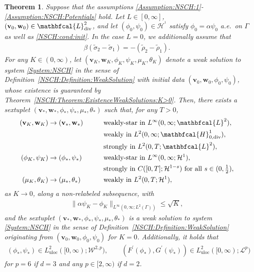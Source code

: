 \documentclass[11pt,reqno]{amsart}
\newtheorem{theorem}{Theorem}[section]
\theoremstyle{remark}
\numberwithin{equation}{section}
\newcommand{\norm}[1]{\| #1 \|}
\newcommand{\Div}{\textnormal{div}}
\newcommand{\Ga}{\Gamma}
\newcommand{\bv}{\mathbf v}
\newcommand{\bw}{\mathbf w}
\newcommand{\uloc}{\mathrm{uloc}}
\begin{document}
\begin{theorem}\label{NSCH:Theorem:Existence:K=0}
Suppose that the assumptions \ref{Assumption:NSCH:1}-\ref{Assumption:NSCH:Potentials} hold. Let $L\in[0,\infty]$, $(\bv_0,\bw_0)\in\mathbfcal{L}^2_\Div$, and let $(\phi_0,\psi_0)\in\mathcal{H}^^1$ satisfy $\phi_0 = \alpha\psi_0$ a.e.~on $\Ga$ as well as \eqref{NSCH:cond:init}.
In the case $L = 0$, we additionally assume that
\begin{align}
	\beta(\tilde\sigma_2 - \tilde\sigma_1) = -(\tilde\rho_2 - \tilde\rho_1).
\end{align}
For any $K\in(0,\infty)$, let $(\bv_K,\bw_K,\phi_K,\psi_K,\mu_K,\theta_K)$ denote a weak solution to system \eqref{System:NSCH} in the sense of Definition~\ref{NSCH:Definition:WeakSolution} with initial data $(\bv_0,\bw_0,\phi_0,\psi_0)$, whose existence is guaranteed by Theorem~\ref{NSCH:Theorem:ExistenceWeakSolutions:K>0}. Then, there exists a sextuplet $(\bv_\ast,\bw_\ast,\phi_\ast,\psi_\ast,\mu_\ast,\theta_\ast)$ such that, for any $T > 0$,
	\begin{alignat*}{2}
		(\bv_K,\bw_K) &\rightarrow (\bv_\ast,\bw_\ast) &&\qquad\text{weakly-star in~} L^\infty(0,\infty;\mathbfcal{L}^2), \\
		& &&\qquad\text{weakly in~} L^2(0,\infty;\mathbfcal{H}^1_{0,\Div}), \\
		& &&\qquad\text{strongly in~} L^2(0,T;\mathbfcal{L}^2), \\
		(\phi_K,\psi_K) &\rightarrow (\phi_\ast,\psi_\ast) &&\qquad\text{weakly-star in~} L^\infty(0,\infty;\mathcal{H}^1), \\
		& &&\qquad\text{strongly in~} C([0,T];\mathcal{H}^{1-s}) \text{~for all~}s\in(0,\tfrac12), \\
		(\mu_K,\theta_K) &\rightarrow (\mu_\ast,\theta_\ast) &&\qquad\text{weakly in~} L^2(0,T;\mathcal{H}^1),
	\end{alignat*}
	as $K\rightarrow 0$, along a non-relabeled subsequence, with
	\begin{align}\label{Est:Bc:K->0}
		\norm{\alpha\psi_K - \phi_K}_{L^\infty(0,\infty;L^2(\Ga))} \leq \sqrt{K},
	\end{align}
	and the sextuplet $(\bv_\ast,\bw_\ast,\phi_\ast,\psi_\ast,\mu_\ast,\theta_\ast)$ is a weak solution  to system \eqref{System:NSCH} in the sense of Definition~\ref{NSCH:Definition:WeakSolution} originating from $(\bv_0,\bw_0,\phi_0,\psi_0)$ for $K = 0$. Additionally, it holds that
    \begin{align*}
        (\phi_\ast,\psi_\ast)\in L^2_\uloc([0,\infty);\mathcal{W}^{2,p}), \qquad (F^\prime(\phi_\ast), G^\prime(\psi_\ast))\in L^2_\uloc([0,\infty);\mathcal{L}^p)
    \end{align*}
    for $p = 6$ if $d = 3$ and any $p\in[2,\infty)$ if $d = 2$.
\end{theorem}
\end{document}
